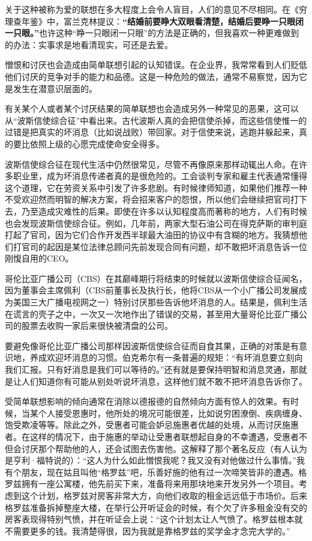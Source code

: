 关于这种被称为爱的联想在多大程度上会令人盲目，人们的意见不尽相同。在《穷理查年鉴》中，富兰克林提议：\textbf{“结婚前要睁大双眼看清楚，结婚后要睁一只眼闭一只眼。”}也许这种“睁一只眼闭一只眼”的方法是正确的，但我喜欢一种更难做到的办法：实事求是地看清现实，可还是去爱。
\par

憎恨和讨厌也会造成由简单联想引起的认知错误。在企业界，我常常看到人们贬低他们讨厌的竞争对手的能力和品德。这是一种危险的做法，通常不易察觉，因为它是发生在潜意识层面的。
\par

有关某个人或者某个讨厌结果的简单联想也会造成另外一种常见的恶果，这可以从“波斯信使综合征”中看出来。古代波斯人真的会把信使杀掉，而这些信使惟一的过错是把真实的坏消息（比如说战败）带回家。对于信使来说，逃跑并躲起来，真的要比依照上级的心愿完成使命安全得多。
\par

波斯信使综合征在现代生活中仍然很常见，尽管不再像原来那样动辄出人命。在许多职业里，成为坏消息传递者真的是很危险的。工会谈判专家和雇主代表通常懂得这个道理，它在劳资关系中引发了许多悲剧。有时候律师知道，如果他们推荐一种不受欢迎然而明智的解决方案，将会招来客户的怨恨，所以他们会继续把官司打下去，乃至造成灾难性的后果。即使在许多以认知程度高而著称的地方，人们有时候也会发现波斯信使综合征。例如，几年前，两家大型石油公司在得克萨斯的审判庭打起了官司，因为它们合作开发西半球最大油田的协议中有含糊的地方。我猜想他们打官司的起因是某位法律总顾问先前发现合同有问题，却不敢把坏消息告诉一位刚愎自用的CEO。
\par

哥伦比亚广播公司（CBS）在其巅峰期行将结束的时候就以波斯信使综合征闻名，因为董事会主席佩利（CBS前董事长及执行长，他将CBS从一个小广播公司发展成为美国三大广播电视网之一）特别讨厌那些告诉他坏消息的人。结果是，佩利生活在谎言的壳子之中，一次又一次地作出了错误的交易，甚至用大量哥伦比亚广播公司的股票去收购一家后来很快被清盘的公司。
\par

要避免像哥伦比亚广播公司那样因波斯信使综合征而自食其果，正确的对策是有意识地，养成欢迎坏消息的习惯。伯克希尔有一条普遍的规矩：“有坏消息要立刻向我们汇报。只有好消息是我们可以等待的。”还有就是要保持明智和消息灵通，那就是让人们知道你有可能从别处听说坏消息，这样他们就不敢不把坏消息告诉你了。
\par

受简单联想影响的倾向通常在消除以德报德的自然倾向方面有惊人的效果。有时候，当某个人接受恩惠时，他所处的境况可能很差，比如说穷困潦倒、疾病缠身、饱受欺凌等等。除此之外，受惠者可能会妒忌施惠者优越的处境，从而讨厌施惠者。在这样的情况下，由于施惠的举动让受惠者联想起自身的不幸遭遇，受惠者不但会讨厌那个帮助他的人，还会试图去伤害他。这解释了那个著名反应（有人认为是亨利·福特说的）：“这人为什么如此憎恨我呢？我又没有对他做过什么事情。”我有个朋友，现在姑且叫他“格罗兹”吧，乐善好施的他有过一次啼笑皆非的遭遇。格罗兹拥有一座公寓楼，他先前买下来，准备将来用那块地来开发另外一个项目。考虑到这个计划，格罗兹对房客非常大方，向他们收取的租金远远低于市场价。后来格罗兹准备拆掉整座大楼，在举行公开听证会的时候，有个欠了许多租金没有交的房客表现得特别气愤，并在听证会上说：“这个计划太让人气愤了。格罗兹根本就不需要更多的钱。我清楚得很，因为我就是靠格罗兹的奖学金才念完大学的。”
\par

